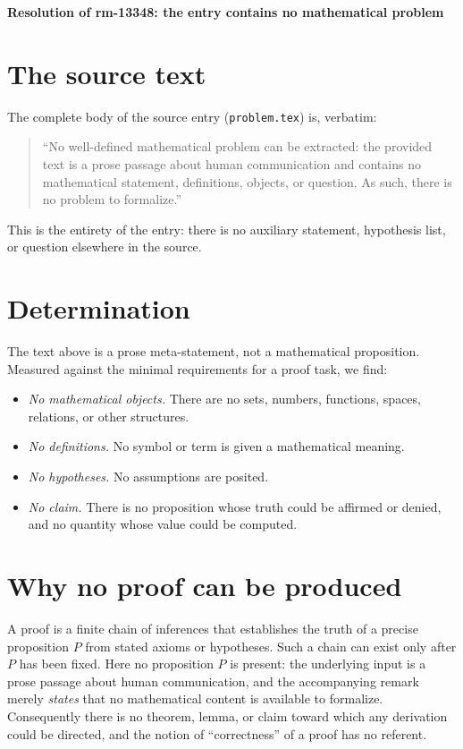 \documentclass{amsart}
\begin{document}
\begin{center}
\textbf{Resolution of rm-13348: the entry contains no mathematical problem}
\end{center}

\section*{The source text}

The complete body of the source entry (\texttt{problem.tex}) is, verbatim:

\begin{quote}
``No well-defined mathematical problem can be extracted: the provided text
is a prose passage about human communication and contains no mathematical
statement, definitions, objects, or question. As such, there is no problem
to formalize.''
\end{quote}

This is the entirety of the entry: there is no auxiliary statement,
hypothesis list, or question elsewhere in the source.

\section*{Determination}

The text above is a prose meta-statement, not a mathematical proposition.
Measured against the minimal requirements for a proof task, we find:
\begin{itemize}
  \item \emph{No mathematical objects.} There are no sets, numbers,
        functions, spaces, relations, or other structures.
  \item \emph{No definitions.} No symbol or term is given a mathematical
        meaning.
  \item \emph{No hypotheses.} No assumptions are posited.
  \item \emph{No claim.} There is no proposition whose truth could be
        affirmed or denied, and no quantity whose value could be computed.
\end{itemize}

\section*{Why no proof can be produced}

A proof is a finite chain of inferences that establishes the truth of a
precise proposition $P$ from stated axioms or hypotheses. Such a chain can
exist only after $P$ has been fixed. Here no proposition $P$ is present: the
underlying input is a prose passage about human communication, and the
accompanying remark merely \emph{states} that no mathematical content is
available to formalize. Consequently there is no theorem, lemma, or claim
toward which any derivation could be directed, and the notion of
``correctness'' of a proof has no referent.
\end{document}

